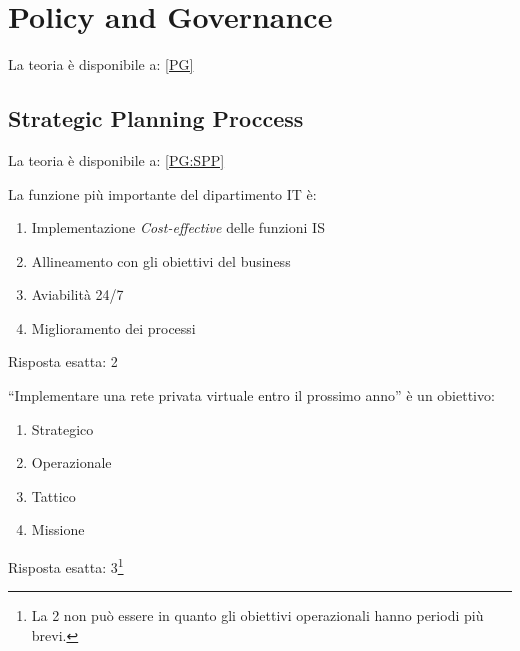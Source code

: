 \section{Policy and Governance}
\label{esPG}

La teoria è disponibile a: \ref{PG}

\subsection{Strategic Planning Proccess}
\label{esPG:SPP}

La teoria è disponibile a: \ref{PG:SPP}

\begin{Exercise} [
  title={Quiz},
  label={esPG1}
  ]

  \Question La funzione più importante del dipartimento IT è:
  \begin{enumerate}
   \item Implementazione \textit{Cost-effective} delle funzioni IS
   \item Allineamento con gli obiettivi del business
   \item Aviabilità 24/7
   \item Miglioramento dei processi
  \end{enumerate}
  
\end{Exercise}

\begin{Answer} [
  ref={esPG1},
  number={1}
  ]

  \Question Risposta esatta: 2
\end{Answer}



\begin{Exercise} [
  title={Quiz},
  label={esPG2}
  ]

  \Question ``Implementare una rete privata virtuale entro il prossimo anno'' è 
un obiettivo:
\begin{enumerate}
 \item Strategico
 \item Operazionale
 \item Tattico
 \item Missione
\end{enumerate}

\end{Exercise}

\begin{Answer} [
  ref={esPG2},
  number={2}
  ]

  \Question Risposta esatta: 3\footnote{La 2 non può essere in quanto gli 
obiettivi operazionali hanno periodi più brevi.}
\end{Answer}




